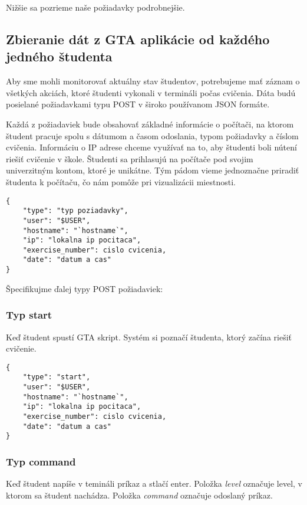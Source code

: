 Nižšie sa pozrieme naše požiadavky podrobnejšie.

\subsection{Zbieranie dát z GTA aplikácie od každého jedného študenta}
\label{sec:apprequirements:gtadata}

Aby sme mohli monitorovať aktuálny stav študentov, potrebujeme mať záznam o
všetkých akciách, ktoré študenti vykonali v termináli počas cvičenia.
Dáta budú posielané požiadavkami typu POST v široko používanom JSON formáte.

Každá z požiadaviek bude obsahovať základné informácie o počítači, na ktorom
študent pracuje spolu s dátumom a časom odoslania, typom požiadavky a číslom cvičenia.
Informáciu o IP adrese chceme využívať na to, aby študenti boli nútení
riešiť cvičenie v škole.
Študenti sa prihlasujú na počítače pod svojim univerzitným kontom, ktoré je unikátne.
Tým pádom vieme jednoznačne priradiť študenta k počítaču, čo nám pomôže pri
vizualizácii miestnosti.

\begin{lstlisting}
{
    "type": "typ poziadavky",
    "user": "$USER",
    "hostname": "`hostname`",
    "ip": "lokalna ip pocitaca",
    "exercise_number": cislo cvicenia,
    "date": "datum a cas"
}
\end{lstlisting}

Špecifikujme ďalej typy POST požiadaviek:

\subsubsection{Typ start}
\label{sec:apprequirements:gtadata:start}

Keď študent spustí GTA skript.
Systém si poznačí študenta, ktorý začína riešiť cvičenie.

\begin{lstlisting}
{
    "type": "start",
    "user": "$USER",
    "hostname": "`hostname`",
    "ip": "lokalna ip pocitaca",
    "exercise_number": cislo cvicenia,
    "date": "datum a cas"
}
\end{lstlisting}

\subsubsection{Typ command}
\label{sec:apprequirements:gtadata:command}

Keď študent napíše v temináli príkaz a stlačí enter.
Položka \textit{level} označuje level, v ktorom sa študent nachádza. Položka
\textit{command} označuje odoslaný príkaz.

